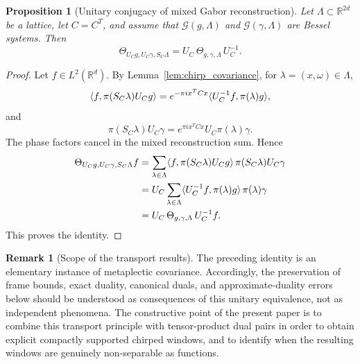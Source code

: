 \documentclass[final,1p,times,authoryear]{elsarticle}
\newtheorem{proposition}[theorem]{Proposition}
\theoremstyle{definition}
\newtheorem{remark}[theorem]{Remark}
\newcommand{\R}{\mathbb{R}}
\newcommand{\1}{\mathbf{1}}
\DeclarePairedDelimiter{\inner}{\langle}{\rangle}
\begin{document}
{\begin{proposition}[Unitary conjugacy of mixed Gabor reconstruction]\label{prop:mixed_conjugacy}
Let $\Lambda\subset\R^{2d}$ be a lattice, let $C=C^T$, and assume that
$\mathcal G(g,\Lambda)$ and $\mathcal G(\gamma,\Lambda)$ are Bessel systems. Then
$$
\Theta_{U_C g,U_C\gamma,S_C\Lambda}
=
U_C\,\Theta_{g,\gamma,\Lambda}\,U_C^{-1}.
$$
\end{proposition}
\begin{proof}
Let $f\in L^2(\R^d)$. By Lemma~\ref{lem:chirp_covariance}, for
$\lambda=(x,\omega)\in\Lambda$,
$$
\inner{f,\pi(S_C\lambda)U_C g}
=
e^{-\pi i x^TCx}
\inner{U_C^{-1}f,\pi(\lambda)g},
$$
and
$$
\pi(S_C\lambda)U_C\gamma
=
e^{\pi i x^TCx}U_C\pi(\lambda)\gamma.
$$
The phase factors cancel in the mixed reconstruction sum. Hence
$$
\begin{aligned}
\Theta_{U_C g,U_C\gamma,S_C\Lambda}f
&=
\sum_{\lambda\in\Lambda}
\inner{f,\pi(S_C\lambda)U_C g}\,\pi(S_C\lambda)U_C\gamma  \\
&=
U_C
\sum_{\lambda\in\Lambda}
\inner{U_C^{-1}f,\pi(\lambda)g}\,\pi(\lambda)\gamma  \\
&=
U_C\,\Theta_{g,\gamma,\Lambda}\,U_C^{-1}f.
\end{aligned}
$$
This proves the identity.
\end{proof}
\begin{remark}[Scope of the transport results]
The preceding identity is an elementary instance of metaplectic covariance. Accordingly, the
preservation of frame bounds, exact duality, canonical duals, and approximate-duality errors below
should be understood as consequences of this unitary equivalence, not as independent phenomena.
The constructive point of the present paper is to combine this transport principle with tensor-product
dual pairs in order to obtain explicit compactly supported chirped windows, and to identify when
the resulting windows are genuinely non-separable as functions.
\end{remark}}
\end{document}
